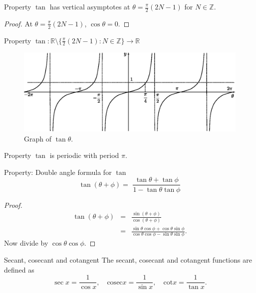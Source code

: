 \begin{thing}{Property}
$\tan$ has vertical asymptotes at $\theta=\frac{\pi}{2}\left(2N-1\right)$ for $N\in\mathbb{Z}$.
\begin{proof}
At $\theta=\frac{\pi}{2}\left(2N-1\right)$, $\cos\theta=0$.
\end{proof}
\end{thing}

\begin{thing}{Property}
$\tan : \mathbb{R}\setminus\{\frac{\pi}{2}(2N-1):N\in\mathbb{Z}\}\to\mathbb{R}$
\end{thing}

\begin{figure}[H]
\centering
\includegraphics[scale=0.75]{img/tan}
\caption{Graph of $\tan\theta$.}
\label{fig:tan}
\end{figure}

\begin{thing}{Property}
$\tan$ is periodic with period $\pi$.
\end{thing}

\begin{thing}{Property: Double angle formula for $\tan$}
$$\tan(\theta+\phi)=\,\, \frac{\tan\theta+\tan\phi}{1-\tan\theta \tan\phi}$$
\begin{proof}
\begin{eqnarray*}
\tan(\theta+\phi)&=&\frac{\sin(\theta+\phi)}{\cos(\theta+\phi)} \nonumber \\
&=& \frac{\sin\theta\cos\phi+\cos\theta\sin\phi}{\cos\theta\cos\phi-\sin\theta\sin\phi}.
\end{eqnarray*}
Now divide by $\cos\theta\cos\phi$.
\end{proof}
\end{thing}

\begin{definition}{Secant, cosecant and cotangent}
The secant, cosecant and cotangent functions are defined as 
\[\sec x=\frac{1}{\cos x},\quad \mathrm{cosec} x=\frac{1}{\sin x},\quad \mathrm{cot} x=\frac{1}{\tan x}. \]
\end{definition}

